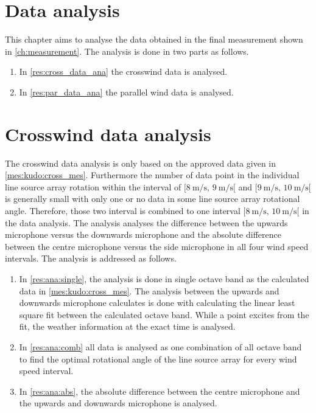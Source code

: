\section{Data analysis}
This chapter aims to analyse the data obtained in the final measurement shown in \autoref{ch:measurement}. The analysis is done in two parts as follows. 

\begin{enumerate}
\item In \autoref{res:cross_data_ana} the crosswind data is analysed.
\item In \autoref{res:par_data_ana} the parallel wind data is analysed.
\end{enumerate}





\section{Crosswind data analysis}\label{res:cross_data_ana}
The crosswind data analysis is only based on the approved data given in \autoref{mes:kudo:cross_mes}. Furthermore the number of data point in the individual line source array rotation within the interval of $[\SI{8}{\meter\per\second},\, \SI{9}{\meter\per\second}[ $ and $[\SI{9}{\meter\per\second},\, \SI{10}{\meter\per\second}[ $ is generally small with only one or no data in some line source array rotational angle. Therefore, those two interval is combined to one interval $[\SI{8}{\meter\per\second},\, \SI{10}{\meter\per\second}[ $ in the data analysis. The analysis analyses the difference between the upwards microphone versus the downwards microphone and the absolute difference between the centre microphone versus the side microphone in all four wind speed intervals. The analysis is addressed as follows.  

\begin{enumerate}
\item  In \autoref{res:ana:single}, the analysis is done in single octave band as the calculated data in \autoref{mes:kudo:cross_mes}. The analysis between the upwards and downwards microphone calculates is done with calculating the linear least square fit between the calculated octave band. While a point excites  from the fit, the weather information at the exact time is analysed.
\item In \autoref{res:ana:comb} all data is analysed as one combination of all octave band to find the optimal rotational angle of the line source array for every wind speed interval. 
\item In \autoref{res:ana:abs}, the absolute difference between the centre microphone and the upwards and downwards microphone is analysed. 
\end{enumerate}

